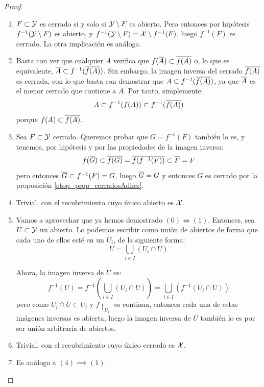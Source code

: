 \begin{prop}
\begin{proof}
\begin{enumerate}[align=left, leftmargin=*]
			\item[\fbox{$(1)\Longleftrightarrow (2)$}] $F\subset\mathcal{Y}$ es cerrado si y solo si $\mathcal{Y}\setminus F$ es abierto. Pero entonces por hipótesis $f^{-1}(\mathcal{Y}\setminus F)$ es abierto, y $f^{-1}(\mathcal{Y}\setminus F)=\mathcal{X}\setminus f^{-1}(F)$, luego $f^{-1}(F)$ es cerrado. La otra implicación es análoga.
			
			\item[\fbox{$(2)\implies (3)$}] Basta con ver que cualquier $A$ verifica que $f(\overline{A})\subset \overline{f(A)}$ o, lo que es equivalente, $\overline{A}\subset f^{-1}(\overline{f(A)})$. Sin embargo, la imagen inversa del cerrado $\overline{f(A)}$ es cerrada, con lo que basta con demostrar que $A\subset f^{-1}(\overline{f(A)})$, ya que $\overline{A}$ es el menor cerrado que contiene a $A$. Por tanto, simplemente:
			\[A\subset f^{-1}(f(A))\subset f^{-1}(\overline{f(A)})\]
			porque $f(A)\subset\overline{f(A)}$.
			
			\item[\fbox{$(3)\implies (2)$}] Sea $F\subset\mathcal{Y}$ cerrado. Queremos probar que $G=f^{-1}(F)$ también lo es, y tenemos, por hipótesis y por las propiedades de la imagen inversa:
			\[f(\overline{G})\subset\overline{f(G)}=\overline{f(f^{-1}(F))}\subset\overline{F}=F\]
			pero entonces $\overline{G}\subset f^{-1}(F)=G$, luego $\overline{G}=G$ y entonces $G$ es cerrado por la proposición \ref{etop_prop_cerradosAdher}.
						
			\item[\fbox{$(0)\implies (4)$}] Trivial, con el recubrimiento cuyo único abierto es $\mathcal{X}$.
			
			\item[\fbox{$(4)\implies (1)$}] Vamos a aprovechar que ya hemos demostrado $(0)\iff (1)$. Entonces, sea $U\subset\mathcal{Y}$ un abierto. Lo podemos escribir como unión de abiertos de forma que cada uno de ellos esté en un $U_i$, de la siguiente forma:
			\[U=\bigcup\limits_{i\in I} (U_i\cap U)\]
			
			Ahora, la imagen inversa de $U$ es:
			\[f^{-1}(U)=f^{-1}\left(\bigcup\limits_{i\in I} (U_i\cap U)\right)=\bigcup\limits_{i\in I} (f^{-1}(U_i\cap U))\]
			pero como $U_i\cap U\subset U_i$ y $f\restriction_{U_i}$ es continua, entonces cada una de estas imágenes inversas es abierta, luego la imagen inversa de $U$ también lo es por ser unión arbitraria de abiertos.
			
			\item[\fbox{$(0)\implies (5)$}] Trivial, con el recubrimiento cuyo único cerrado es $\mathcal{X}$.
			
			\item[\fbox{$(5)\implies (2)$}] Es análogo a $(4)\implies (1)$. \qedhere
		\end{enumerate}
	\end{proof}
\end{prop}

